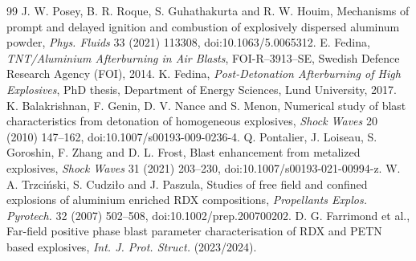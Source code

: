 \documentclass{article}
\begin{document}
\begin{thebibliography}{99}
     J. W. Posey, B. R. Roque, S. Guhathakurta and R. W. Houim, Mechanisms of prompt and delayed ignition and combustion of explosively dispersed aluminum powder, \emph{Phys. Fluids} 33 (2021) 113308, doi:10.1063/5.0065312.
     E. Fedina, \emph{TNT/Aluminium Afterburning in Air Blasts}, FOI-R--3913--SE, Swedish Defence Research Agency (FOI), 2014.
     K. Fedina, \emph{Post-Detonation Afterburning of High Explosives}, PhD thesis, Department of Energy Sciences, Lund University, 2017.
     K. Balakrishnan, F. Genin, D. V. Nance and S. Menon, Numerical study of blast characteristics from detonation of homogeneous explosives, \emph{Shock Waves} 20 (2010) 147--162, doi:10.1007/s00193-009-0236-4.
     Q. Pontalier, J. Loiseau, S. Goroshin, F. Zhang and D. L. Frost, Blast enhancement from metalized explosives, \emph{Shock Waves} 31 (2021) 203--230, doi:10.1007/s00193-021-00994-z.
     W. A. Trzci\'nski, S. Cudzi\l{}o and J. Paszula, Studies of free field and confined explosions of aluminium enriched RDX compositions, \emph{Propellants Explos. Pyrotech.} 32 (2007) 502--508, doi:10.1002/prep.200700202.
     D. G. Farrimond et al., Far-field positive phase blast parameter characterisation of RDX and PETN based explosives, \emph{Int. J. Prot. Struct.} (2023/2024).
\end{thebibliography}
\end{document}
